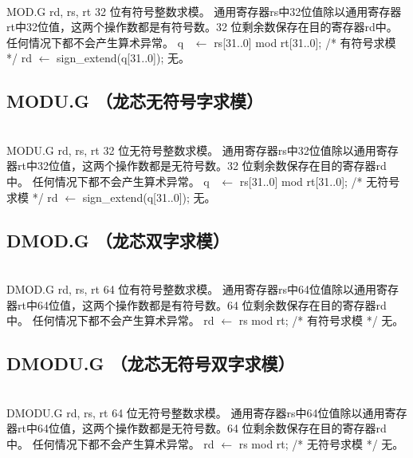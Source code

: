 \begin{instructionblk}
   \\
  \instructionbody
  {MOD.G rd, rs, rt}
  {32 位有符号整数求模。}
  {通用寄存器rs中32位值除以通用寄存器rt中32位值，这两个操作数都是有符号数。32
  位剩余数保存在目的寄存器rd中。 \fldnewline
  任何情况下都不会产生算术异常。}
  {q~ $\leftarrow$ rs[31..0] mod rt[31..0]; /* 有符号求模 */ \newline
  rd $\leftarrow$ sign\_extend(q[31..0]);}
  {无。}
\end{instructionblk}

\subsection{MODU.G （龙芯无符号字求模）}

\begin{instructionblk}
   \\
  \instructionbody
  {MODU.G rd, rs, rt}
  {32 位无符号整数求模。}
  {通用寄存器rs中32位值除以通用寄存器rt中32位值，这两个操作数都是无符号数。32
  位剩余数保存在目的寄存器rd中。 \fldnewline
  任何情况下都不会产生算术异常。}
  {q~ $\leftarrow$ rs[31..0] mod rt[31..0]; /* 无符号求模 */ \newline
  rd $\leftarrow$ sign\_extend(q[31..0]);}
  {无。}
\end{instructionblk}

\subsection{DMOD.G （龙芯双字求模）}

\begin{instructionblk}
   \\
  \instructionbody
  {DMOD.G rd, rs, rt}
  {64 位有符号整数求模。}
  {通用寄存器rs中64位值除以通用寄存器rt中64位值，这两个操作数都是有符号数。64
  位剩余数保存在目的寄存器rd中。 \fldnewline
  任何情况下都不会产生算术异常。}
  {rd $\leftarrow$ rs mod rt; /* 有符号求模 */}
  {无。}
\end{instructionblk}

\subsection{DMODU.G （龙芯无符号双字求模）}

\begin{instructionblk}
   \\
  \instructionbody
  {DMODU.G rd, rs, rt}
  {64 位无符号整数求模。}
  {通用寄存器rs中64位值除以通用寄存器rt中64位值，这两个操作数都是无符号数。64
  位剩余数保存在目的寄存器rd中。 \fldnewline
  任何情况下都不会产生算术异常。}
  {rd $\leftarrow$ rs mod rt; /* 无符号求模 */}
  {无。}
\end{instructionblk}

